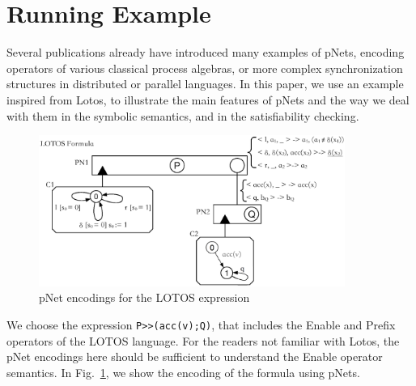 \documentclass{lncs/llncs}
\begin{document}




\section{Running Example}
\label{section:examples}

Several publications \cite{HMZ:PDP15,henrio:Forte2016} already have introduced
many examples of pNets, encoding
operators of various classical process algebras, or more complex
synchronization structures in distributed or parallel languages.
In this paper, we use an example inspired from Lotos, to illustrate
the main features of pNets and the way we deal with them in the symbolic
semantics, and in the satisfiability checking. 


\begin{figure}[h]
  \centerline{\includegraphics[width=10cm]{XFIG/LOTOSFormula.eps}}
  \caption{pNet encodings for the LOTOS expression}  \label{schema:lotos-pnet}
\end{figure}

We choose the expression \texttt{P>>(acc(v);Q)}, that includes the
Enable and Prefix 
operators of the LOTOS language. For the readers not familiar with
Lotos, the pNet encodings here should be sufficient to understand the
Enable operator semantics.
In Fig.~\ref{schema:lotos-pnet}, we show the encoding of the formula using pNets.
\end{document}

